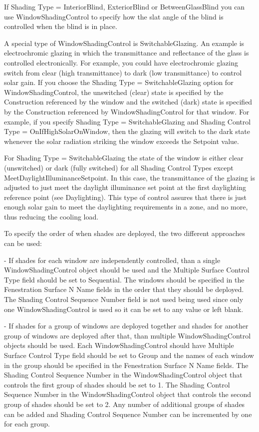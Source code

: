 If Shading Type = InteriorBlind, ExteriorBlind or BetweenGlassBlind you can use WindowShadingControl to specify how the slat angle of the blind is controlled when the blind is in place.

A special type of WindowShadingControl is SwitchableGlazing. An example is electrochromic glazing in which the transmittance and reflectance of the glass is controlled electronically. For example, you could have electrochromic glazing switch from clear (high transmittance) to dark (low transmittance) to control solar gain. If you choose the Shading Type = SwitchableGlazing option for WindowShadingControl, the unswitched (clear) state is specified by the Construction referenced by the window and the switched (dark) state is specified by the Construction referenced by WindowShadingControl for that window. For example, if you specify Shading Type = SwitchableGlazing and Shading Control Type = OnIfHighSolarOnWindow, then the glazing will switch to the dark state whenever the solar radiation striking the window exceeds the Setpoint value.

For Shading Type = SwitchableGlazing the state of the window is either clear (unswitched) or dark (fully switched) for all Shading Control Types except MeetDaylightIlluminanceSetpoint. In this case, the transmittance of the glazing is adjusted to just meet the daylight illuminance set point at the first daylighting reference point (see Daylighting). This type of control assures that there is just enough solar gain to meet the daylighting requirements in a zone, and no more, thus reducing the cooling load.

To specify the order of when shades are deployed, the two different approaches can be used:

- If shades for each window are independently controlled, than a single WindowShadingControl object should be used and the Multiple Surface Control Type field should be set to Sequential. The windows should be specified in the Fenestration Surface N Name fields in the order that they should be deployed. The Shading Control Sequence Number field is not used being used since only one WindowShadingControl is used so it can be set to any value or left blank.

- If shades for a group of windows are deployed together and shades for another group of windows are deployed after that, than multiple WindowShadingControl objects should be used. Each WindowShadingControl should have Multiple Surface Control Type field should be set to Group and the names of each window in the group should be specified in the Fenestration Surface N Name fields. The Shading Control Sequence Number in the  WindowShadingControl object that controls the first group of shades should be set to 1. The Shading Control Sequence Number in the  WindowShadingControl object that controls the second group of shades should be set to 2. Any number of additional groups of shades can be added and Shading Control Sequence Number can be incremented by one for each group.

